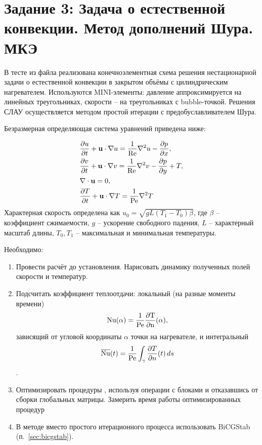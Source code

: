 \section{Задание 3: Задача о естественной конвекции. Метод дополнений Шура. МКЭ}
В тесте  из файла 
реализована конечноэлементная схема решения нестационарной задачи о естественной
конвекции в закрытом объёмы с цилиндрическим нагревателем.
Используются MINI-элементы:
давление аппроксимируется на линейных треугольниках,
скорости -- на треугольниках с bubble-точкой.
Решения СЛАУ осуществляется методом простой
итерации с предобуславливателем Шура.

Безразмерная определяющая система уравнений приведена ниже:

\begin{equation}
\label{eq:natural_convection_y}
\begin{aligned}
& \frac{\partial u}{\partial t} + \boldsymbol{\rm u}\cdot\nabla u = \frac{1}{\mathrm{Re}} \nabla^2 u - \frac{\partial p}{\partial x}, \\
& \frac{\partial v}{\partial t} + \boldsymbol{\rm u}\cdot\nabla v = \frac{1}{\mathrm{Re}} \nabla^2 v - \frac{\partial p}{\partial y} + T, \\
& \nabla \cdot \boldsymbol{\rm u} = 0, \\
& \frac{\partial T}{\partial t} + \boldsymbol{\rm u}\cdot\nabla T = \frac{1}{\mathrm{Pe}} \nabla^2 T
\end{aligned}
\end{equation}
Характерная скорость определена как
$u_0 = \sqrt{gL(T_1 - T_0) \beta}$, где $\beta$ -- коэффициент сжимаемости, $g$ -- ускорение свободного падения, $L$ -- характерный масштаб длины, $T_0, T_1$ -- максимальная и минимальная температуры.

Необходимо:
\begin{enumerate}
\item  Провести расчёт до установления. Нарисовать динамику полученных полей скорости и температур.
\item  Подсчитать коэффициент теплоотдачи: локальный  (на разные моменты времени)
       $$\rm Nu(\alpha) = \frac{1}{\rm Pe} \frac{\partial T}{\partial n} (\alpha),$$
       зависящий от угловой координаты $\alpha$ точки на нагревателе,
       и интегральный
       $$\overline{\rm Nu}(t) = \frac{1}{\rm Pe} \int_{\gamma}\frac{\partial T}{\partial n}(t)\, ds$$.
\item  Оптимизировать процедуры , 
       используя операции с блоками и отказавшись от сборки глобальных матрицы. Замерить время работы оптимизированных процедур
\item  В методе  вместо простого итерационного процесса использовать BiCGStab (п.~\ref{sec:bicgstab}).
\end{enumerate}

